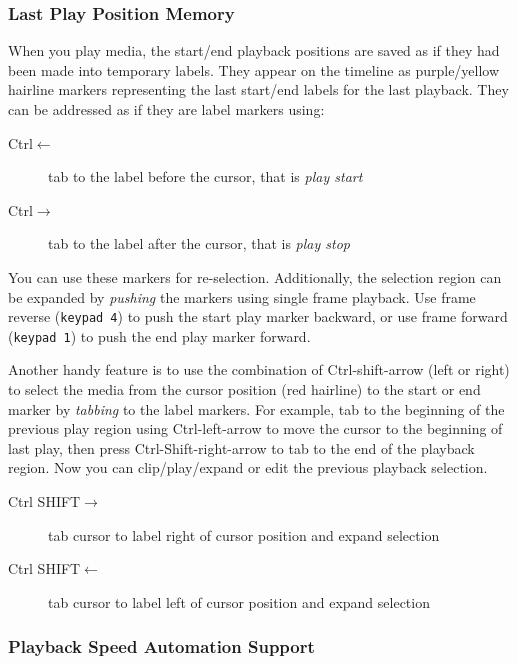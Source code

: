 \subsubsection*{Last Play Position Memory}%
\label{ssub:last_play_position_memory}


When you play media, the start/end playback positions are saved as if they had been made into temporary labels.  
They appear on the timeline as purple/yellow hairline markers representing the last start/end labels for the last playback. 
They can be addressed as if they are label markers using:

\begin{description}
    \item[Ctrl$\leftarrow$]   tab to the label before the cursor, that is \textit{play start}
    \item[Ctrl$\rightarrow$]   tab to the label after the cursor, that is \textit{play stop}
\end{description}


You can use these markers for re-selection.  
Additionally, the selection region can be expanded by \textit{pushing} the markers using single frame playback.  
Use frame reverse (\texttt{keypad 4}) to push the start play marker backward, or use frame forward (\texttt{keypad 1}) to push the end play marker forward.

Another handy feature is to use the combination of Ctrl-shift-arrow (left or right) to select the media from the cursor position (red hairline) to the start or end marker by \textit{tabbing} to the label markers.  
For example, tab to the beginning of the previous play region using Ctrl-left-arrow to move the cursor to the beginning of last play, then press Ctrl-Shift-right-arrow to tab to the end of the playback region. 
Now you can clip/play/expand or edit the previous playback selection.

\begin{description}
    \item[Ctrl SHIFT$\rightarrow$] 	  tab cursor to label right of cursor position and expand selection
    \item[Ctrl SHIFT$\leftarrow$] 	  tab cursor to label left of cursor position and expand selection
\end{description}


\subsubsection*{Playback Speed Automation Support}%
\label{ssub:playback_speed_automation_support}


